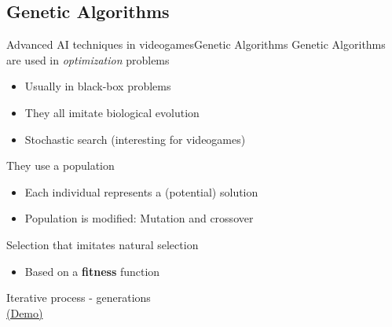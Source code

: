 \documentclass[10pt,compress]{beamer} %
\begin{document}
\subsection{Genetic Algorithms}
\begin{frame}{Advanced AI techniques in videogames}{Genetic Algorithms} 
	Genetic Algorithms are used in \textit{optimization} problems
	\begin{itemize}
		\item Usually in black-box problems
		\item They all imitate biological evolution
		\item Stochastic search (interesting for videogames)
	\end{itemize}

	They use a population
	\begin{itemize}
		\item Each individual represents a (potential) solution
        \item Population is modified: Mutation and crossover
	\end{itemize}
	Selection that imitates natural selection
	\begin{itemize}
		\item Based on a \textbf{fitness} function
	\end{itemize}
	Iterative process - generations\\


    \smallskip
	\href{http://rednuht.org/genetic_cars_2/}{(Demo)}

\end{frame}

\end{document}
